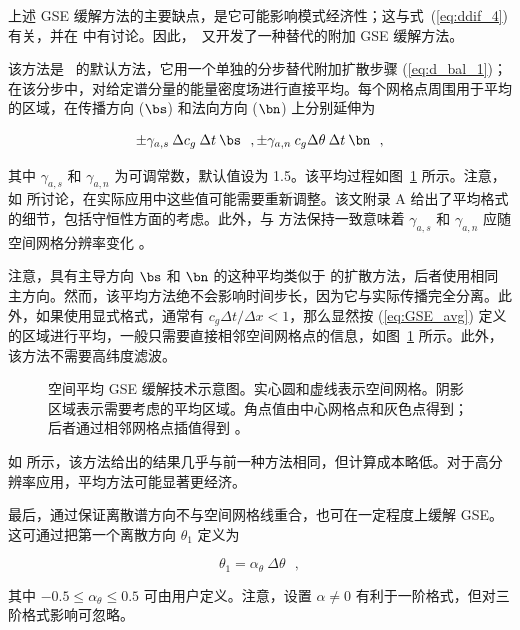 
\vspace{\baselineskip} 
\vspace{\baselineskip} 



上述 GSE 缓解方法的主要缺点，是它可能影响模式经济性；这与式~(\ref{eq:ddif_4}) 有关，并在 \cite{tol:Waves01a,tol:OMOD02b} 中有讨论。因此，\ws\ 又开发了一种替代的附加 GSE 缓解方法。

该方法是 \ws\ 的默认方法，它用一个单独的分步替代附加扩散步骤 (\ref{eq:d_bal_1})；在该分步中，对给定谱分量的能量密度场进行直接平均。每个网格点周围用于平均的区域，在传播方向 ($\bs$) 和法向方向 ($\bn$) 上分别延伸为

\begin{equation}
\pm \gamma_{a,s} \: \Delta c_g \: \Delta t \: \bs \:\:\: ,
\pm \gamma_{a,n} \: c_g \Delta \theta \: \Delta t \: \bn \:\:\: , \label{eq:GSE_avg}
\end{equation}

\noindent
其中 $\gamma_{a,s}$ 和 $\gamma_{a,n}$ 为可调常数，默认值设为 1.5。该平均过程如图~\ref{fig:GSE_1} 所示。注意，如 \cite{tol:OMOD02b} 所讨论，在实际应用中这些值可能需要重新调整。该文附录 A 给出了平均格式的细节，包括守恒性方面的考虑。此外，与 \cite{art:BH87} 方法保持一致意味着 $\gamma_{a,s}$ 和 $\gamma_{a,n}$ 应随空间网格分辨率变化 \citep[见][Appendix]{tol:OMOD08a}。

注意，具有主导方向 $\bs$ 和 $\bn$ 的这种平均类似于 \cite{art:BH87} 的扩散方法，后者使用相同主方向。然而，该平均方法绝不会影响时间步长，因为它与实际传播完全分离。此外，如果使用显式格式，通常有 $c_g \Delta t / \Delta x < 1$，那么显然按 (\ref{eq:GSE_avg}) 定义的区域进行平均，一般只需要直接相邻空间网格点的信息，如图~\ref{fig:GSE_1} 所示。此外，该方法不需要高纬度滤波。

\begin{figure} \begin{center}
\caption{空间平均 GSE 缓解技术示意图。实心圆和虚线表示空间网格。阴影区域表示需要考虑的平均区域。角点值由中心网格点和灰色点得到；后者通过相邻网格点插值得到 \citep[引自][]{tol:OMOD02b}。}
\label{fig:GSE_1} \botline
\end{center}
\end{figure}

如 \cite{tol:OMOD02b,tol:OMB02b} 所示，该方法给出的结果几乎与前一种方法相同，但计算成本略低。对于高分辨率应用，平均方法可能显著更经济。



最后，通过保证离散谱方向不与空间网格线重合，也可在一定程度上缓解 GSE。这可通过把第一个离散方向 $\theta_1$ 定义为


\begin{equation}
\theta_1 = \alpha_\theta \: \Delta \theta \:\:\: , \label{eq:theta1}
\end{equation}

\noindent
其中 $-0.5 \leq \alpha_\theta \leq 0.5$ 可由用户定义。注意，设置 $\alpha \neq 0$ 有利于一阶格式，但对三阶格式影响可忽略。
 
